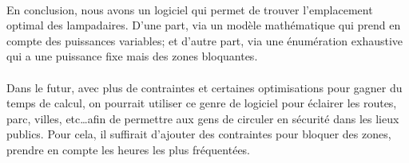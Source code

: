  \paragraph{} En conclusion, nous avons un logiciel qui permet de trouver l'emplacement optimal des lampadaires. D'une part, via un modèle mathématique qui prend en compte des puissances variables; et d'autre part, via une énumération exhaustive qui a une puissance fixe mais des zones bloquantes.

 \paragraph{} Dans le futur, avec plus de contraintes et certaines optimisations pour gagner du temps de calcul, on pourrait utiliser ce genre de logiciel pour éclairer les routes, parc, villes, etc\ldots afin de permettre aux gens de circuler en sécurité dans les lieux publics. Pour cela, il suffirait d'ajouter des contraintes pour bloquer des zones, prendre en compte les heures les plus fréquentées. 

 \paragraph{}